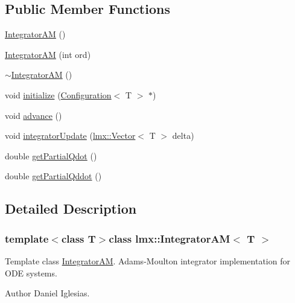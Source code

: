 \subsection*{Public Member Functions}
\begin{DoxyCompactItemize}
\item 
\hyperlink{classlmx_1_1IntegratorAM_a7d64ed1e0c88226015aa4caa2ab909b0}{Integrator\-A\-M} ()
\item 
\hyperlink{classlmx_1_1IntegratorAM_a35e0d1746118c153ebb0a7bf273ae547}{Integrator\-A\-M} (int ord)
\item 
\hyperlink{classlmx_1_1IntegratorAM_a304126a16c4921ae478399aa9db1a6aa}{$\sim$\-Integrator\-A\-M} ()
\item 
void \hyperlink{classlmx_1_1IntegratorAM_a931654fc8a6a5c516d54981f2d3ea8f4}{initialize} (\hyperlink{classlmx_1_1Configuration}{Configuration}$<$ T $>$ $\ast$)
\item 
void \hyperlink{classlmx_1_1IntegratorAM_a9ddeb6b8a0338bcaee3b1a75ef44a579}{advance} ()
\item 
void \hyperlink{classlmx_1_1IntegratorAM_a820e76e8e905b0443cea0cce770057c7}{integrator\-Update} (\hyperlink{classlmx_1_1Vector}{lmx\-::\-Vector}$<$ T $>$ delta)
\item 
double \hyperlink{classlmx_1_1IntegratorAM_a12f749769e2f20545dbedbf744a3a314}{get\-Partial\-Qdot} ()
\item 
double \hyperlink{classlmx_1_1IntegratorAM_ad29429e37ded23f55bad02ff5a8dc111}{get\-Partial\-Qddot} ()
\end{DoxyCompactItemize}


\subsection{Detailed Description}
\subsubsection*{template$<$class T$>$class lmx\-::\-Integrator\-A\-M$<$ T $>$}

Template class \hyperlink{classlmx_1_1IntegratorAM}{Integrator\-A\-M}. Adams-\/\-Moulton integrator implementation for O\-D\-E systems. 

\begin{DoxyAuthor}{Author}
Daniel Iglesias. 
\end{DoxyAuthor}


